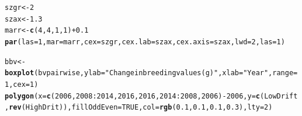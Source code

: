 \documentclass{article}\usepackage[]{graphicx}\usepackage[]{color}
\makeatletter
\newcommand{\hlnum}[1]{\textcolor[rgb]{0.686,0.059,0.569}{#1}}%
\newcommand{\hlstr}[1]{\textcolor[rgb]{0.192,0.494,0.8}{#1}}%
\newcommand{\hlopt}[1]{\textcolor[rgb]{0,0,0}{#1}}%
\newcommand{\hlstd}[1]{\textcolor[rgb]{0.345,0.345,0.345}{#1}}%
\newcommand{\hlkwb}[1]{\textcolor[rgb]{0.69,0.353,0.396}{#1}}%
\newcommand{\hlkwc}[1]{\textcolor[rgb]{0.333,0.667,0.333}{#1}}%
\newcommand{\hlkwd}[1]{\textcolor[rgb]{0.737,0.353,0.396}{\textbf{#1}}}%
\newenvironment{kframe}{%
 \def\at@end@of@kframe{}%
 \ifinner\ifhmode%
  \def\at@end@of@kframe{\end{minipage}}%
  \begin{minipage}{\columnwidth}%
 \fi\fi%
 \def\FrameCommand##1{\hskip\@totalleftmargin \hskip-\fboxsep
 \colorbox{shadecolor}{##1}\hskip-\fboxsep
     \hskip-\linewidth \hskip-\@totalleftmargin \hskip\columnwidth}%
 \MakeFramed {\advance\hsize-\width
   \@totalleftmargin\z@ \linewidth\hsize
   \@setminipage}}%
 {\par\unskip\endMakeFramed%
 \at@end@of@kframe}
\newenvironment{knitrout}{}{} %
\makeatother
\begin{document}
\begin{knitrout}
\color{fgcolor}\begin{kframe}
\begin{alltt}
\hlstd{szgr} \hlkwb{<-} \hlnum{2}
\hlstd{szax} \hlkwb{<-} \hlnum{1.3}
\hlstd{marr} \hlkwb{<-} \hlkwd{c}\hlstd{(}\hlnum{4}\hlstd{,} \hlnum{4}\hlstd{,} \hlnum{1}\hlstd{,} \hlnum{1}\hlstd{)} \hlopt{+} \hlnum{0.1}
\hlkwd{par}\hlstd{(}\hlkwc{las}\hlstd{=}\hlnum{1}\hlstd{,}\hlkwc{mar}\hlstd{=marr,} \hlkwc{cex}\hlstd{=szgr,} \hlkwc{cex.lab}\hlstd{=szax ,} \hlkwc{cex.axis}\hlstd{=szax,} \hlkwc{lwd}\hlstd{=}\hlnum{2} \hlstd{,} \hlkwc{las}\hlstd{=}\hlnum{1}\hlstd{)}

\hlstd{bbv} \hlkwb{<-} \hlkwd{boxplot}\hlstd{(bvpairwise,}\hlkwc{ylab}\hlstd{=}\hlstr{"Change in breeding values (g)"}\hlstd{,} \hlkwc{xlab}\hlstd{=}\hlstr{"Year"}\hlstd{,} \hlkwc{range} \hlstd{=} \hlnum{1}\hlstd{,}\hlkwc{cex}\hlstd{=}\hlnum{1}\hlstd{)}
\hlkwd{polygon}\hlstd{(}\hlkwc{x} \hlstd{=} \hlkwd{c}\hlstd{(}\hlnum{2006}\hlstd{,}\hlnum{2008}\hlopt{:}\hlnum{2014}\hlstd{,}\hlnum{2016}\hlstd{,}\hlnum{2016}\hlstd{,}\hlnum{2014}\hlopt{:}\hlnum{2008}\hlstd{,}\hlnum{2006}\hlstd{)} \hlopt{-}\hlnum{2006}\hlstd{,} \hlkwc{y} \hlstd{=} \hlkwd{c}\hlstd{(LowDrift,}\hlkwd{rev}\hlstd{(HighDrit)),}\hlkwc{fillOddEven} \hlstd{=} \hlnum{TRUE}\hlstd{,} \hlkwc{col}\hlstd{=}\hlkwd{rgb}\hlstd{(}\hlnum{0.1}\hlstd{,}\hlnum{0.1}\hlstd{,}\hlnum{0.1}\hlstd{,}\hlnum{0.3}\hlstd{),} \hlkwc{lty}\hlstd{=}\hlnum{2}\hlstd{)}


\end{alltt}
\end{kframe}
\end{knitrout}
\end{document}
